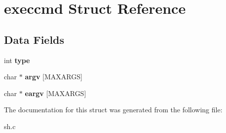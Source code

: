 \hypertarget{structexeccmd}{}\section{execcmd Struct Reference}
\label{structexeccmd}
\subsection*{Data Fields}
\begin{DoxyCompactItemize}
\item 
\mbox{\label{structexeccmd_a9db03fe1a8bff63e9205fc98eeb19741}} 
int {\bfseries type}
\item 
\mbox{\label{structexeccmd_a00e53af4bc0e28bbd6842bdceaee1ea9}} 
char $\ast$ {\bfseries argv} \mbox{[}M\+A\+X\+A\+R\+GS\mbox{]}
\item 
\mbox{\label{structexeccmd_ab3444b3d0c478e5338f55b7dffe70521}} 
char $\ast$ {\bfseries eargv} \mbox{[}M\+A\+X\+A\+R\+GS\mbox{]}
\end{DoxyCompactItemize}


The documentation for this struct was generated from the following file\+:\begin{DoxyCompactItemize}
\item 
sh.\+c\end{DoxyCompactItemize}
